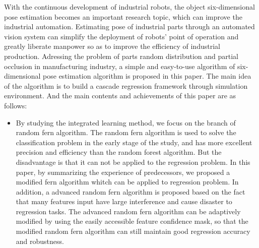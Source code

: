 \begin{englishabstract}

With the continuous development of industrial robots, the object six-dimensional pose estimation becomes an important research topic, which can improve the industrial automation. Estimating pose of industrial parts through an automated vision system can simplify the deployment of robots' point of operation and greatly liberate manpower so as to improve the efficiency of industrial production. Adressing the problem of parts random distribution and partial occlusion in manufacturing industry, a simple and easy-to-use algorithm of six-dimensional pose estimation algorithm is proposed in this paper. The main idea of the algorithm is to build a cascade regression framework through simulation environment. And the main contents and achievements of this paper are as follows:




\begin{itemize}
\item By studying the integrated learning method, we focus on the branch of random fern algorithm. The random fern algorithm is used to solve the classification problem in the early stage of the study, and has more excellent precision and efficiency than the random forest algorithm. But the disadvantage is that it can not be applied to the regression problem. In this paper, by summarizing the experience of predecessors, we proposed a modified fern algorithm whitch can be applied to regression problem. In addition, a advanced random fern algorithm is proposed based on the fact that many features input have large interference and cause disaster to regression tasks. The advanced random fern algorithm can be adaptively modified by using the easily accessible feature confidence mask, so that the modified random fern algorithm can still maintain good regression accuracy and robustness.


\end{itemize}
\end{englishabstract}
